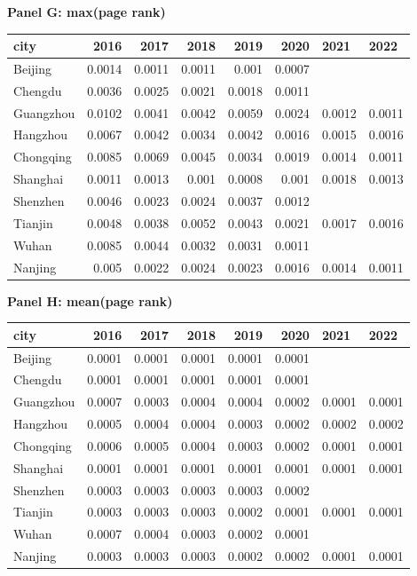 \textbf{Panel G: max(page rank)}\\
\begin{tabular}{lrrrrrll}
\hline
 city      &   2016 &   2017 &   2018 &   2019 &   2020 & 2021   & 2022   \\
\hline
 Beijing   & 0.0014 & 0.0011 & 0.0011 & 0.001  & 0.0007 &        &        \\
 Chengdu   & 0.0036 & 0.0025 & 0.0021 & 0.0018 & 0.0011 &        &        \\
 Guangzhou & 0.0102 & 0.0041 & 0.0042 & 0.0059 & 0.0024 & 0.0012 & 0.0011 \\
 Hangzhou  & 0.0067 & 0.0042 & 0.0034 & 0.0042 & 0.0016 & 0.0015 & 0.0016 \\
 Chongqing & 0.0085 & 0.0069 & 0.0045 & 0.0034 & 0.0019 & 0.0014 & 0.0011 \\
 Shanghai  & 0.0011 & 0.0013 & 0.001  & 0.0008 & 0.001  & 0.0018 & 0.0013 \\
 Shenzhen  & 0.0046 & 0.0023 & 0.0024 & 0.0037 & 0.0012 &        &        \\
 Tianjin   & 0.0048 & 0.0038 & 0.0052 & 0.0043 & 0.0021 & 0.0017 & 0.0016 \\
 Wuhan     & 0.0085 & 0.0044 & 0.0032 & 0.0031 & 0.0011 &        &        \\
 Nanjing   & 0.005  & 0.0022 & 0.0024 & 0.0023 & 0.0016 & 0.0014 & 0.0011 \\
\hline
\end{tabular}

\textbf{Panel H: mean(page rank)}\\
\begin{tabular}{lrrrrrll}
\hline
 city      &   2016 &   2017 &   2018 &   2019 &   2020 & 2021   & 2022   \\
\hline
 Beijing   & 0.0001 & 0.0001 & 0.0001 & 0.0001 & 0.0001 &        &        \\
 Chengdu   & 0.0001 & 0.0001 & 0.0001 & 0.0001 & 0.0001 &        &        \\
 Guangzhou & 0.0007 & 0.0003 & 0.0004 & 0.0004 & 0.0002 & 0.0001 & 0.0001 \\
 Hangzhou  & 0.0005 & 0.0004 & 0.0004 & 0.0003 & 0.0002 & 0.0002 & 0.0002 \\
 Chongqing & 0.0006 & 0.0005 & 0.0004 & 0.0003 & 0.0002 & 0.0001 & 0.0001 \\
 Shanghai  & 0.0001 & 0.0001 & 0.0001 & 0.0001 & 0.0001 & 0.0001 & 0.0001 \\
 Shenzhen  & 0.0003 & 0.0003 & 0.0003 & 0.0003 & 0.0002 &        &        \\
 Tianjin   & 0.0003 & 0.0003 & 0.0003 & 0.0002 & 0.0001 & 0.0001 & 0.0001 \\
 Wuhan     & 0.0007 & 0.0004 & 0.0003 & 0.0002 & 0.0001 &        &        \\
 Nanjing   & 0.0003 & 0.0003 & 0.0003 & 0.0002 & 0.0002 & 0.0001 & 0.0001 \\
\hline
\end{tabular}

